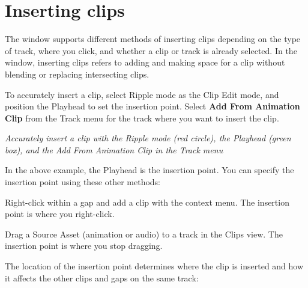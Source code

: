 \chapter{Inserting clips}
\hypertarget{md__hey_tea_9_2_library_2_package_cache_2com_8unity_8timeline_0d1_87_85_2_documentation_0i_2clp__insert}{}\label{md__hey_tea_9_2_library_2_package_cache_2com_8unity_8timeline_0d1_87_85_2_documentation_0i_2clp__insert}
\label{md__hey_tea_9_2_library_2_package_cache_2com_8unity_8timeline_0d1_87_85_2_documentation_0i_2clp__insert_autotoc_md4615}%
%
 The  window supports different methods of inserting clips depending on the type of track, where you click, and whether a clip or track is already selected. In the  window, inserting clips refers to adding and making space for a clip without blending or replacing intersecting clips.

To accurately insert a clip, select Ripple mode as the Clip Edit mode, and position the  Playhead to set the insertion point. Select {\bfseries{Add From Animation Clip}} from the Track menu for the track where you want to insert the clip.



{\itshape Accurately insert a clip with the Ripple mode (red circle), the  Playhead (green box), and the Add From Animation Clip in the Track menu}

In the above example, the  Playhead is the insertion point. You can specify the insertion point using these other methods\+:


\begin{DoxyItemize}
\item Right-\/click within a gap and add a clip with the context menu. The insertion point is where you right-\/click.
\item Drag a Source Asset (animation or audio) to a track in the Clips view. The insertion point is where you stop dragging.
\end{DoxyItemize}

The location of the insertion point determines where the clip is inserted and how it affects the other clips and gaps on the same track\+:


